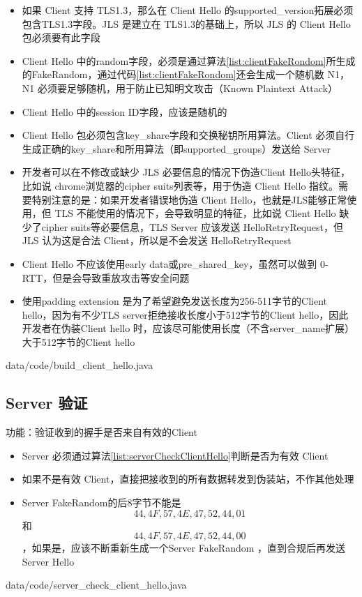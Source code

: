 \begin{itemize}
	\item 如果 Client 支持 TLS1.3，那么在 Client Hello 的supported\_version拓展必须包含TLS1.3字段。JLS 是建立在 TLS1.3的基础上，所以 JLS 的 Client Hello 包必须要有此字段

	\item Client Hello 中的random字段，必须是通过算法\ref{list:clientFakeRondom}所生成的FakeRandom，通过代码\ref{list:clientFakeRondom}还会生成一个随机数 N1，N1 必须要足够随机，用于防止已知明文攻击（Known Plaintext Attack）

	\item Client Hello 中的session ID字段，应该是随机的

	\item Client Hello 包必须包含key\_share字段和交换秘钥所用算法。Client 必须自行生成正确的key\_share和所用算法（即supported\_groups）发送给 Server

	\item 开发者可以在不修改或缺少 JLS 必要信息的情况下伪造Client Hello头特征，比如说 chrome浏览器的cipher suits列表等，用于伪造 Client Hello 指纹。需要特别注意的是：如果开发者错误地伪造 Client Hello，也就是JLS能够正常使用，但 TLS 不能使用的情况下，会导致明显的特征，比如说 Client Hello 缺少了cipher suits等必要信息，TLS Server 应该发送 HelloRetryRequest，但JLS 认为这是合法 Client，所以是不会发送 HelloRetryRequest

	\item Client Hello 不应该使用early data或pre\_shared\_key，虽然可以做到 0-RTT，但是会导致重放攻击等安全问题

	\item 使用padding extension 是为了希望避免发送长度为256-511字节的Client hello\cite{langley2015rfc}，因为有不少TLS server拒绝接收长度小于512字节的Client hello，因此开发者在伪装Client hello 时，应该尽可能使用长度（不含server\_name扩展）大于512字节的Client hello
\end{itemize}

 {data/code/build_client_hello.java}


\subsection{Server 验证}
功能：验证收到的握手是否来自有效的Client
\begin{itemize}
	\item Server 必须通过算法\ref{list:serverCheckClientHello}判断是否为有效 Client

	\item 如果不是有效 Client，直接把接收到的所有数据转发到伪装站，不作其他处理

	\item Server FakeRandom的后8字节不能是\[ 44,4F,57,4E,47,52,44,01 \]和\[ 44,4F,57,4E,47,52,44,00 \]，如果是，应该不断重新生成一个Server FakeRandom ，直到合规后再发送 Server Hello

\end{itemize}
 {data/code/server_check_client_hello.java}

